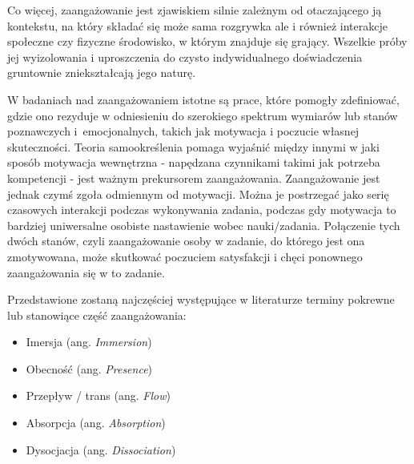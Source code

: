 Co więcej, zaangażowanie jest zjawiskiem silnie zależnym od otaczającego ją kontekstu, na który
składać się może sama rozgrywka ale i również interakcje społeczne czy fizyczne środowisko, w
którym znajduje się grający. Wszelkie próby jej wyizolowania i uproszczenia do czysto indywidualnego
doświadczenia gruntownie zniekształcają jego naturę.

W badaniach nad zaangażowaniem istotne są prace, które pomogły zdefiniować, gdzie ono rezyduje w
odniesieniu do szerokiego spektrum wymiarów lub stanów poznawczych i~emocjonalnych, takich jak motywacja
i poczucie własnej skuteczności. Teoria samookreślenia pomaga wyjaśnić między innymi w jaki
sposób motywacja wewnętrzna - napędzana czynnikami takimi jak potrzeba kompetencji - jest ważnym
prekursorem zaangażowania. Zaangażowanie jest jednak czymś zgoła odmiennym od motywacji\cite{measuring_engagement}.
Można je postrzegać jako serię czasowych interakcji podczas wykonywania zadania, podczas gdy motywacja to
bardziej uniwersalne osobiste nastawienie wobec nauki/zadania. Połączenie tych dwóch stanów, czyli
zaangażowanie osoby w zadanie, do którego jest ona zmotywowana, może skutkować poczuciem satysfakcji
i chęci ponownego zaangażowania się w to zadanie\cite{measuring_engagement}.

Przedstawione zostaną najczęściej występujące w literaturze terminy pokrewne lub stanowiące część
zaangażowania:

\begin{itemize}
      \item Imersja (ang. \textit{Immersion})
      \item Obecność (ang. \textit{Presence})
      \item Przepływ / trans  (ang. \textit{Flow})
      \item Absorpcja (ang. \textit{Absorption})
      \item Dysocjacja (ang. \textit{Dissociation})
\end{itemize}

